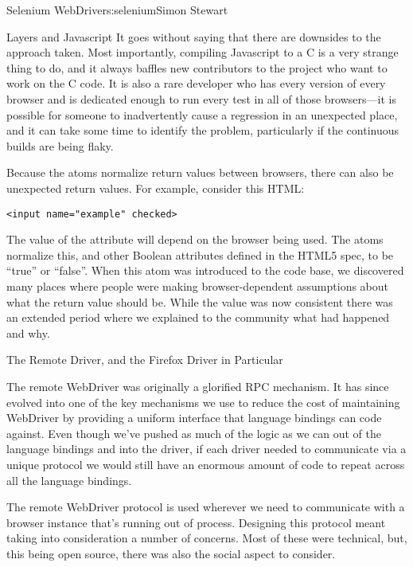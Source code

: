\begin{aosachapter}{Selenium WebDriver}{s:selenium}{Simon Stewart}
\begin{aosasect1}{Layers and Javascript}
It goes without saying that there are downsides to the approach taken.
Most importantly, compiling Javascript to a C  is a very
strange thing to do, and it always baffles new contributors to the
project who want to work on the C code. It is also a rare developer
who has every version of every browser and is dedicated enough to run
every test in all of those browsers---it is possible for someone to
inadvertently cause a regression in an unexpected place, and it can
take some time to identify the problem, particularly if the continuous
builds are being flaky.

Because the atoms normalize return values between browsers, there can
also be unexpected return values. For example, consider this HTML:

\begin{verbatim}
<input name="example" checked>
\end{verbatim}

\noindent The value of the  attribute will depend on the browser
being used. The atoms normalize this, and other Boolean attributes
defined in the HTML5 spec, to be ``true'' or ``false''. When this atom
was introduced to the code base, we discovered many places where
people were making browser-dependent assumptions about what the return
value should be. While the value was now consistent there was an
extended period where we explained to the community what had happened
and why.

\end{aosasect1}

\begin{aosasect1}{The Remote Driver, and the Firefox Driver in Particular}

The remote WebDriver was originally a glorified RPC mechanism. It has
since evolved into one of the key mechanisms we use to reduce the cost
of maintaining WebDriver by providing a uniform interface that
language bindings can code against. Even though we've pushed as much
of the logic as we can out of the language bindings and into the
driver, if each driver needed to communicate via a unique protocol we
would still have an enormous amount of code to repeat across all the
language bindings.

The remote WebDriver protocol is used wherever we need to communicate
with a browser instance that's running out of process.  Designing this
protocol meant taking into consideration a number of concerns. Most of
these were technical, but, this being open source, there was also the
social aspect to consider.


\end{aosasect1}
\end{aosachapter}
